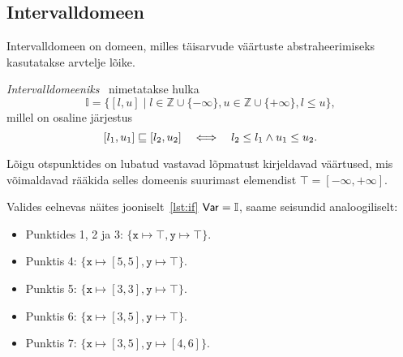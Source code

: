 \documentclass[../thesis.tex]{subfiles}
\begin{document}
\subsection{Intervalldomeen}
Intervalldomeen on domeen, milles täisarvude väärtuste abstraheerimiseks kasutatakse arvtelje lõike.

\begin{definition}
\emph{Intervalldomeeniks}~\cite[55]{seidl_foundations} nimetatakse hulka
\[
	\mathbb{I} = \{ [l, u] \mid l \in \mathbb{Z} \cup \{-\infty\}, u \in \mathbb{Z} \cup \{+\infty\}, l \leq u \},
\]
millel on osaline järjestus
\[
	[l_1, u_1] \sqsubseteq [l_2, u_2] \quad\Longleftrightarrow\quad l_2 \leq l_1 \land u_1 \leq u_2.
\]
\end{definition}

Lõigu otspunktides on lubatud vastavad lõpmatust kirjeldavad väärtused, mis võimaldavad rääkida selles domeenis suurimast elemendist $\top = [-\infty, +\infty]$.

Valides eelnevas näites jooniselt~\ref{lst:if} $\mathsf{Var} = \mathbb{I}$, saame seisundid analoogiliselt:
\begin{itemize}
	\item Punktides 1, 2 ja 3: $\{ \texttt{x} \mapsto \top, \texttt{y} \mapsto \top \}$.
	\item Punktis 4: $\{ \texttt{x} \mapsto [5, 5], \texttt{y} \mapsto \top \}$.
	\item Punktis 5: $\{ \texttt{x} \mapsto [3, 3], \texttt{y} \mapsto \top \}$.
	\item Punktis 6: $\{ \texttt{x} \mapsto [3, 5], \texttt{y} \mapsto \top \}$.
	\item Punktis 7: $\{ \texttt{x} \mapsto [3, 5], \texttt{y} \mapsto [4, 6] \}$.
\end{itemize}
\end{document}
